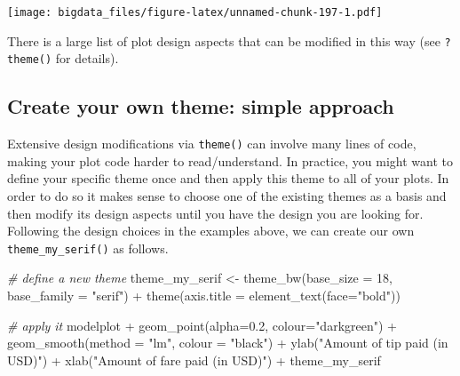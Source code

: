 \documentclass[
  12pt,
]{style/krantz}
\newenvironment{Shaded}{\begin{snugshade}}{\end{snugshade}}
\newcommand{\AttributeTok}[1]{\textcolor[rgb]{0.77,0.63,0.00}{#1}}
\newcommand{\CommentTok}[1]{\textcolor[rgb]{0.56,0.35,0.01}{\textit{#1}}}
\newcommand{\DecValTok}[1]{\textcolor[rgb]{0.00,0.00,0.81}{#1}}
\newcommand{\FloatTok}[1]{\textcolor[rgb]{0.00,0.00,0.81}{#1}}
\newcommand{\FunctionTok}[1]{\textcolor[rgb]{0.00,0.00,0.00}{#1}}
\newcommand{\NormalTok}[1]{#1}
\newcommand{\OtherTok}[1]{\textcolor[rgb]{0.56,0.35,0.01}{#1}}
\newcommand{\SpecialCharTok}[1]{\textcolor[rgb]{0.00,0.00,0.00}{#1}}
\newcommand{\StringTok}[1]{\textcolor[rgb]{0.31,0.60,0.02}{#1}}
\begin{document}
\texttt{[image: bigdata\_files/figure-latex/unnamed-chunk-197-1.pdf]}

There is a large list of plot design aspects that can be modified in this way (see \texttt{?theme()} for details).

\hypertarget{create-your-own-theme-simple-approach}{%
\subsection{Create your own theme: simple approach}\label{create-your-own-theme-simple-approach}}

Extensive design modifications via \texttt{theme()} can involve many lines of code, making your plot code harder to read/understand. In practice, you might want to define your specific theme once and then apply this theme to all of your plots. In order to do so it makes sense to choose one of the existing themes as a basis and then modify its design aspects until you have the design you are looking for. Following the design choices in the examples above, we can create our own \texttt{theme\_my\_serif()} as follows.

\begin{Shaded}
\begin{Highlighting}[]
\CommentTok{\# \textquotesingle{}define\textquotesingle{} a new theme}
\NormalTok{theme\_my\_serif }\OtherTok{\textless{}{-}}      
  \FunctionTok{theme\_bw}\NormalTok{(}\AttributeTok{base\_size =} \DecValTok{18}\NormalTok{, }\AttributeTok{base\_family =} \StringTok{"serif"}\NormalTok{) }\SpecialCharTok{+}
  \FunctionTok{theme}\NormalTok{(}\AttributeTok{axis.title =} \FunctionTok{element\_text}\NormalTok{(}\AttributeTok{face=}\StringTok{"bold"}\NormalTok{))}

\CommentTok{\# apply it }
\NormalTok{modelplot }\SpecialCharTok{+}
     \FunctionTok{geom\_point}\NormalTok{(}\AttributeTok{alpha=}\FloatTok{0.2}\NormalTok{, }\AttributeTok{colour=}\StringTok{"darkgreen"}\NormalTok{) }\SpecialCharTok{+}
     \FunctionTok{geom\_smooth}\NormalTok{(}\AttributeTok{method =} \StringTok{"lm"}\NormalTok{, }\AttributeTok{colour =} \StringTok{"black"}\NormalTok{) }\SpecialCharTok{+}
     \FunctionTok{ylab}\NormalTok{(}\StringTok{"Amount of tip paid (in USD)"}\NormalTok{) }\SpecialCharTok{+}
     \FunctionTok{xlab}\NormalTok{(}\StringTok{"Amount of fare paid (in USD)"}\NormalTok{) }\SpecialCharTok{+}
\NormalTok{  theme\_my\_serif}
\end{Highlighting}
\end{Shaded}
\end{document}
